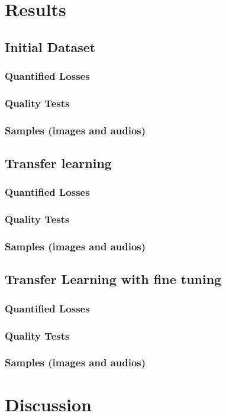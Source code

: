 \documentclass{book}
\begin{document}
\chapter{Results}
\section{Initial Dataset}
\subsection{Quantified Losses}
\subsection{Quality Tests}
\subsection{Samples (images and audios)}
\section{Transfer learning}
\subsection{Quantified Losses}
\subsection{Quality Tests}
\subsection{Samples (images and audios)}
\section{Transfer Learning with fine tuning}
\subsection{Quantified Losses}
\subsection{Quality Tests}
\subsection{Samples (images and audios)}

\chapter{Discussion}
\end{document}
